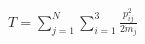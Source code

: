 \documentclass[preview]{standalone}
\begin{document}
\begin{align*}
T = \sum_{j=1}^N \sum_{i=1}^3\frac{p_{ij}^2}{2m_j}
\end{align*}
\end{document}
